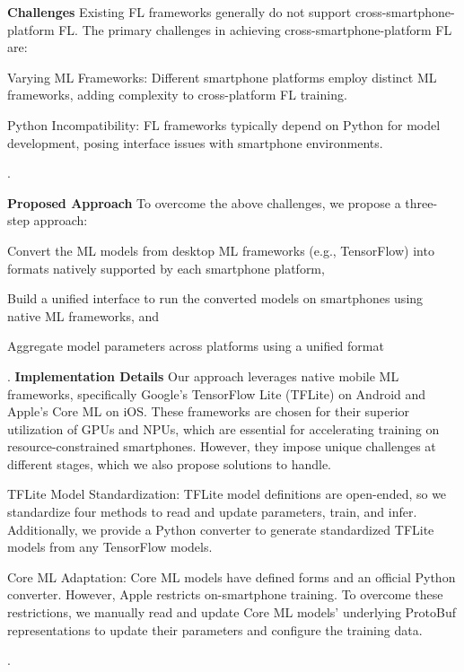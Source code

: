 \documentclass[letterpaper]{article} %
\begin{document}
\noincident \textbf{Challenges} 
Existing FL frameworks generally do not support
cross-smartphone-platform FL.
The primary challenges in achieving cross-smartphone-platform FL are:
\begin{enumerate*}[label=\arabic*)]
    \item Varying ML Frameworks: Different smartphone platforms employ distinct ML frameworks, adding complexity to cross-platform FL training.
    \item Python Incompatibility: FL frameworks typically depend on Python for model development, posing interface issues with smartphone environments.
\end{enumerate*}.


\noincident \textbf{Proposed Approach} 
To overcome the above challenges, we propose a three-step approach:
\begin{enumerate*}[label=\arabic*.]
    \item Convert the ML models from desktop ML frameworks (e.g., TensorFlow)
        into formats natively supported by each smartphone platform,
    \item Build a unified interface to run the converted models on smartphones
        using native ML frameworks, and
    \item Aggregate model parameters across platforms using a unified format
\end{enumerate*}.
\noincident \textbf{Implementation Details} 
Our approach leverages native mobile ML frameworks, specifically Google's TensorFlow Lite (TFLite) on Android and Apple's Core ML on iOS. These frameworks are chosen for their superior utilization of GPUs and NPUs, which are essential for accelerating training on resource-constrained smartphones. 
However, they impose unique challenges at different stages, which we also propose solutions to handle. 
\begin{enumerate*}[label=\arabic*)]
    \item TFLite Model Standardization: TFLite model definitions are open-ended, so we standardize four methods to read and update parameters, train, and infer. Additionally, we provide a Python converter to generate standardized TFLite models from any TensorFlow models.
    \item Core ML Adaptation: Core ML models have defined forms and an official Python converter. However, Apple restricts on-smartphone training. To overcome these restrictions, we manually read and update Core ML models' underlying ProtoBuf representations to update their parameters and configure the training data.
\end{enumerate*}.
\end{document}
